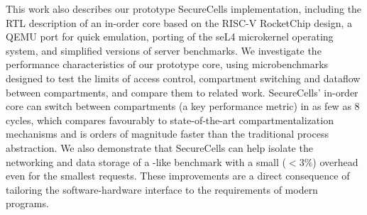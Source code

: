This work also describes our prototype SecureCells implementation, including
the RTL description of an in-order core based on the RISC-V RocketChip design,
a QEMU port for quick emulation, porting of the seL4 microkernel operating
system, and simplified versions of server benchmarks.
We investigate the performance characteristics of our prototype core, using
microbenchmarks designed to test the limits of access control, compartment 
switching and dataflow between compartments, and compare them to related work.
SecureCells' in-order core can switch between compartments (a key performance
metric) in as few as 8 cycles, which compares favourably to state-of-the-art
compartmentalization mechanisms and is orders of magnitude faster than the
traditional process abstraction.
We also demonstrate that SecureCells can help isolate the networking and
data storage of a -like benchmark with a small ($<3\%$)
overhead even for the smallest requests.
These improvements are a direct consequence of tailoring the software-hardware
interface to the requirements of modern programs.





